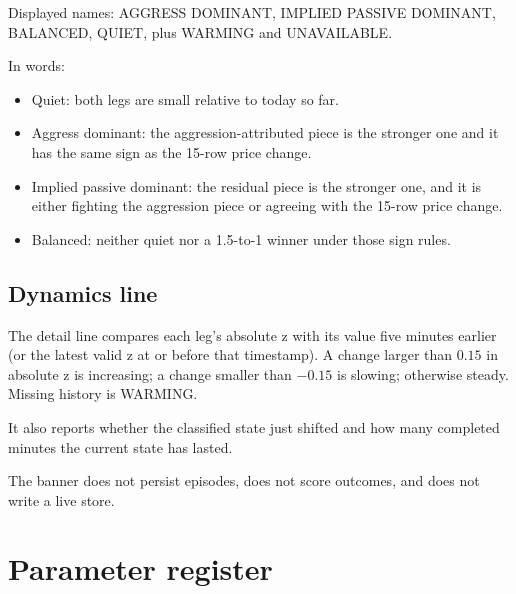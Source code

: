 \documentclass[11pt]{article}
\begin{document}
Displayed names: AGGRESS DOMINANT, IMPLIED PASSIVE DOMINANT, BALANCED,
QUIET, plus WARMING and UNAVAILABLE.

In words:

\begin{itemize}
    \item Quiet: both legs are small relative to today so far.
    \item Aggress dominant: the aggression-attributed piece is the
    stronger one and it has the same sign as the 15-row price change.
    \item Implied passive dominant: the residual piece is the stronger
    one, and it is either fighting the aggression piece or agreeing with
    the 15-row price change.
    \item Balanced: neither quiet nor a 1.5-to-1 winner under those
    sign rules.
\end{itemize}

\subsection{Dynamics line}

The detail line compares each leg's absolute z with its value five
minutes earlier (or the latest valid z at or before that timestamp).
A change larger than \(0.15\) in absolute z is increasing; a change
smaller than \(-0.15\) is slowing; otherwise steady.  Missing history
is WARMING.

It also reports whether the classified state just shifted and how many
completed minutes the current state has lasted.

The banner does not persist episodes, does not score outcomes, and does
not write a live store.

\section{Parameter register}
\end{document}
